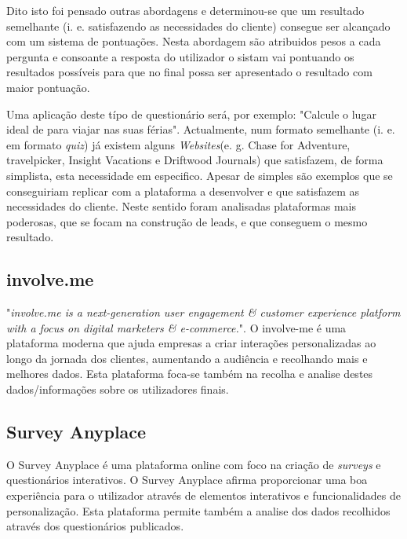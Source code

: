 Dito isto foi pensado outras abordagens e determinou-se que um resultado semelhante (i. e. satisfazendo as necessidades do cliente) consegue ser alcançado com um sistema de pontuações. Nesta abordagem são atribuidos pesos a cada pergunta e consoante a resposta do utilizador o sistam vai pontuando os resultados possíveis para que no final possa ser apresentado o resultado com maior pontuação.

Uma aplicação deste típo de questionário será, por exemplo: "Calcule o lugar ideal de para viajar nas suas férias". Actualmente, num formato semelhante (i. e. em formato \textit{quiz}) já existem alguns \textit{Websites}(e. g. Chase for Adventure\cite{chaseforadventure}, travelpicker\cite{travelpicker}, Insight Vacations\cite{insightvacations} e Driftwood Journals\cite{driftwoodjournals}) que satisfazem, de forma simplista, esta necessidade em especifico. Apesar de simples são exemplos que se conseguiriam replicar com a plataforma a desenvolver e que satisfazem as necessidades do cliente. Neste sentido foram analisadas plataformas mais poderosas, que se focam na construção de leads, e que conseguem o mesmo resultado.


\subsection{involve.me}
\label{involvemeM}


"\textit{involve.me is a next-generation user engagement \& customer experience platform with a focus on digital marketers \& e-commerce.}"\cite{involve}. O involve-me é uma plataforma moderna que ajuda empresas a criar interações personalizadas ao longo da jornada dos clientes, aumentando a audiência e recolhando mais e melhores dados. Esta plataforma foca-se também na recolha e analise destes dados/informações sobre os utilizadores finais.


\subsection{Survey Anyplace}
\label{surveyanyplaceM}




O Survey Anyplace é uma plataforma online com foco na criação de \textit{surveys} e questionários interativos. O Survey Anyplace afirma proporcionar uma boa experiência para o utilizador através de elementos interativos e funcionalidades de personalização. Esta plataforma permite também a analise dos dados recolhidos através dos questionários publicados.


